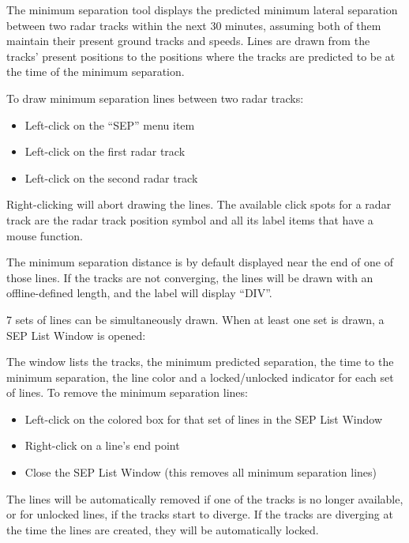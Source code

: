 \documentclass[a4paper,oneside,11pt]{memoir}
\begin{document}
The minimum separation tool displays the predicted minimum lateral separation between two radar tracks within the next 30 minutes, assuming both of them maintain their present ground tracks and speeds. Lines are drawn from the tracks’ present positions to the positions where the tracks are predicted to be at the time of the minimum separation.

To draw minimum separation lines between two radar tracks:
\begin{itemize}
    \item Left-click on the “SEP” menu item
    \item Left-click on the first radar track
    \item Left-click on the second radar track
\end{itemize}

\bigskip

Right-clicking will abort drawing the lines. The available click spots for a radar track are the radar track position symbol and all its label items that have a mouse function.

\bigskip

The minimum separation distance is by default displayed near the end of one of those lines. If the tracks are not converging, the lines will be drawn with an offline-defined length, and the label will display “DIV”.

\bigskip

7 sets of lines can be simultaneously drawn. When at least one set is drawn, a SEP List Window is opened:

\bigskip


The window lists the tracks, the minimum predicted separation, the time to the minimum separation, the line color and a locked/unlocked indicator for each set of lines.
To remove the minimum separation lines:

\begin{itemize}
    \item Left-click on the colored box for that set of lines in the SEP List Window
    \item Right-click on a line’s end point
    \item Close the SEP List Window (this removes all minimum separation lines)
\end{itemize}

The lines will be automatically removed if one of the tracks is no longer available, or for unlocked lines, if the tracks start to diverge. If the tracks are diverging at the time the lines are created, they will be automatically locked.
\end{document}

